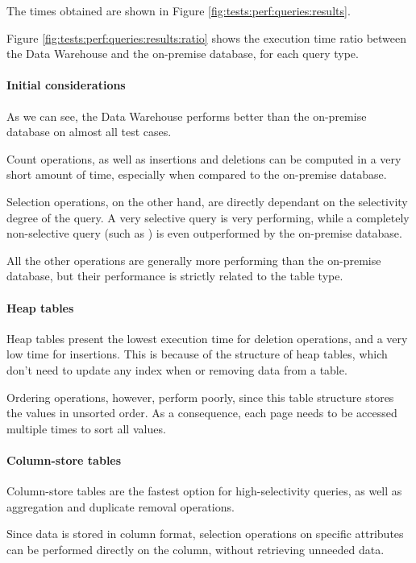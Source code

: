     The times obtained are shown in Figure \ref{fig:tests:perf:queries:results}.
    
    Figure \ref{fig:tests:perf:queries:results:ratio} shows the execution time ratio between the Data Warehouse and the on-premise database, for each query type.
    
    \paragraph{Initial considerations}
        As we can see, the Data Warehouse performs better than the on-premise database on almost all test cases.
        
        Count operations, as well as insertions and deletions can be computed in a very short amount of time, especially when compared to the on-premise database.
        
        Selection operations, on the other hand, are directly dependant on the selectivity degree of the query.
        A very selective query is very performing, while a completely non-selective query (such as ) is even outperformed by the on-premise database.
        
        All the other operations are generally more performing than the on-premise database, but their performance is strictly related to the table type.
        
    \paragraph{Heap tables}
        Heap tables present the lowest execution time for deletion operations, and a very low time for insertions.
        This is because of the structure of heap tables, which don't need to update any index when or removing data from a table.
    
        Ordering operations, however, perform poorly, since this table structure stores the values in unsorted order.
        As a consequence, each page needs to be accessed multiple times to sort all values.
        
    \paragraph{Column-store tables}
        Column-store tables are the fastest option for high-selectivity queries, as well as aggregation and duplicate removal operations.
        
        Since data is stored in column format, selection operations on specific attributes can be performed directly on the column, without retrieving unneeded data.
        
